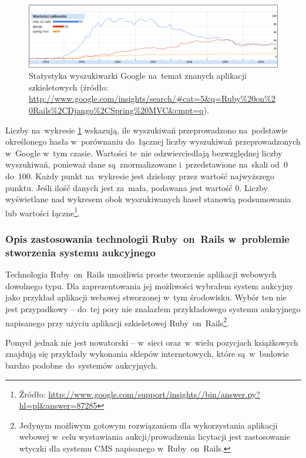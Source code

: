 \begin{figure}[!t]
\centering
\includegraphics[width=\textwidth]{obrazki/googleresearch.png}
\caption{Statystyka wyszukiwarki Google na~temat znanych aplikacji szkieletowych (źródło: \url{http://www.google.com/insights/search/\#cat=5\&q=Ruby\%20on\%20Rails\%2CDjango\%2CSpring\%20MVC\&cmpt=q}).}
\label{fig.wykres.googleresearch}
\end{figure}

Liczby na~wykresie \ref{fig.wykres.googleresearch} wskazują, ile wyszukiwań przeprowadzono na~podstawie określonego hasła w~porównaniu do~łącznej liczby wyszukiwań przeprowadzonych w~Google w~tym czasie. Wartości te~nie odzwierciedlają bezwzględnej liczby wyszukiwań, ponieważ dane są~znormalizowane i~przedstawione na~skali od~0 do~100. Każdy punkt na~wykresie jest dzielony przez wartość najwyższego punktu. Jeśli ilość danych jest za~mała, podawana jest wartość 0. Liczby wyświetlane nad wykresem obok wyszukiwanych haseł stanowią podsumowania lub wartości łączne\footnote{Źródło: \url{http://www.google.com/support/insights//bin/answer.py?hl=pl\&answer=87285}}.

\subsubsection{Opis zastosowania technologii Ruby~on~Rails w~problemie stworzenia systemu aukcyjnego}

Technologia Ruby~on~Rails umożliwia proste tworzenie aplikacji webowych dowolnego typu. Dla zaprezentowania jej możliwości wybrałem system aukcyjny jako przykład aplikacji webowej stworzonej w~tym środowisku. Wybór ten nie jest przypadkowy -- do~tej pory nie znalazłem przykładowego systemu aukcyjnego napisanego przy użyciu aplikacji szkieletowej Ruby~on~Rails\footnote{Jedynym możliwym gotowym rozwiązaniem dla wykorzystania aplikacji webowej w~celu wystawiania aukcji/prowadzenia licytacji jest zastosowanie wtyczki %
dla systemu CMS %
napisanego w~Ruby~on~Rails.}.


Pomysł jednak nie jest nowatorski -- w~sieci oraz~w~wielu pozycjach książkowych znajdują się przykłady wykonania sklepów internetowych, które są~w~budowie bardzo podobne do~systemów aukcyjnych.


